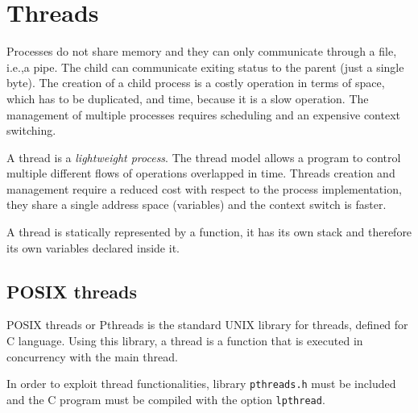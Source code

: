 \chapter{Threads}
Processes do not share memory and they can only communicate through a file, i.e.,\@ a pipe. The child can communicate exiting status to the parent (just a single byte). The creation of a child process is a costly operation in terms of space, which has to be duplicated, and time, because it is a slow operation. The management of multiple processes requires scheduling and an expensive context switching.

A thread is a \textit{lightweight process}. The thread model allows a program to control multiple different flows of operations overlapped in time. Threads creation and management require a reduced cost with respect to the process implementation, they share a single address space (variables) and the context switch is faster.

A thread is statically represented by a function, it has its own stack and therefore its own variables declared inside it.

\section{POSIX threads}
POSIX threads or Pthreads is the standard UNIX library for threads, defined for C language. Using this library, a thread is a function that is executed in concurrency with the main thread.

In order to exploit thread functionalities, library \texttt{pthreads.h} must be included and the C program must be compiled with the option \texttt{lpthread}.

